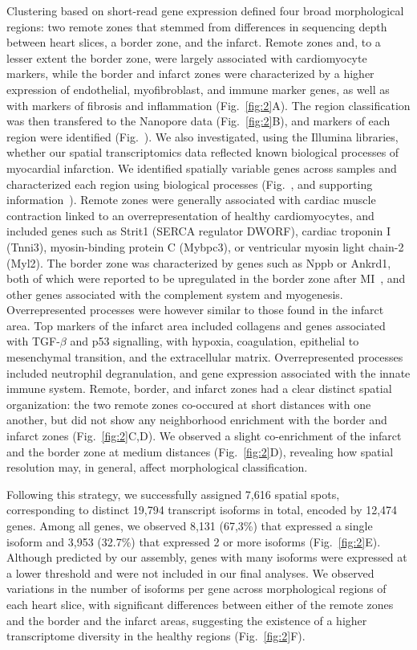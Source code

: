 \documentclass[utf8]{FrontiersinHarvard} %
\begin{document}
Clustering based on short-read gene expression defined four broad morphological regions: two remote zones that stemmed from differences in sequencing depth between heart slices, a border zone, and the infarct. 
Remote zones and, to a lesser extent the border zone, were largely associated with cardiomyocyte markers, while the border and infarct zones were characterized by a higher expression of endothelial, myofibroblast, and immune marker genes, as well as with markers of fibrosis and inflammation (Fig.~\ref{fig:2}A).
The region classification was then transfered to the Nanopore data (Fig.~\ref{fig:2}B), and markers of each region were identified (Fig.~).
We also investigated, using the Illumina libraries, whether our spatial transcriptomics data reflected known biological processes of myocardial infarction.
We identified spatially variable genes across samples and characterized each region using biological processes (Fig.~, and supporting information~).
Remote zones were generally associated with cardiac muscle contraction linked to an overrepresentation of healthy cardiomyocytes, and included genes such as Strit1 (SERCA regulator DWORF), cardiac troponin I (Tnni3), myosin-binding protein C (Mybpc3), or ventricular myosin light chain-2 (Myl2). 
The border zone was characterized by genes such as Nppb or Ankrd1, both of which were reported to be upregulated in the border zone after MI~\citep{Hama1995:Nppb,Mikhailov2008:Ankrd1}, and other genes associated with the complement system and myogenesis.
Overrepresented processes were however similar to those found in the infarct area.
Top markers of the infarct area included collagens and genes associated with TGF-$\beta$ and p53 signalling, with hypoxia, coagulation, epithelial to mesenchymal transition, and the extracellular matrix.
Overrepresented processes included neutrophil degranulation, and gene expression associated with the innate immune system.
Remote, border, and infarct zones had a clear distinct spatial organization: the two remote zones co-occured at short distances with one another, but did not show any neighborhood enrichment with the border and infarct zones (Fig.~\ref{fig:2}C,D). 
We observed a slight co-enrichment of the infarct and the border zone at medium distances (Fig.~\ref{fig:2}D), revealing how spatial resolution may, in general, affect morphological classification.

Following this strategy, we successfully assigned 7,616 spatial spots, corresponding to distinct 19,794 transcript isoforms in total, encoded by 12,474 genes.
Among all genes, we observed 8,131 (67,3\%) that expressed a single isoform and 3,953 (32.7\%) that expressed 2 or more isoforms (Fig.~\ref{fig:2}E).
Although predicted by our assembly, genes with many isoforms were expressed at a lower threshold and were not included in our final analyses.
We observed variations in the number of isoforms per gene across morphological regions of each heart slice, with significant differences between either of the remote zones and the border and the infarct areas, suggesting the existence of a higher transcriptome diversity in the healthy regions (Fig.~\ref{fig:2}F). 
\end{document}
